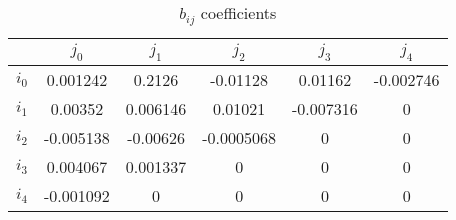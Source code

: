 \begin{table}[h!]
  \centering
  \caption{$b_{ij}$ coefficients}
  \label{tab:noise_b}
  \begin{tabular}{c| c c c c c}
		  & $j_0$ 	  & $j_1$    & $j_2$ 	  & $j_3$	  & $j_4$ \\
	\hline
	$i_0$ & 0.001242  & 0.2126	 & -0.01128	  & 0.01162	  & -0.002746 \\
	$i_1$ & 0.00352   & 0.006146 & 0.01021	  & -0.007316 & 0 \\
	$i_2$ & -0.005138 & -0.00626 & -0.0005068 & 0 		  & 0 \\
	$i_3$ & 0.004067  & 0.001337 & 0 		  & 0 		  & 0 \\
	$i_4$ & -0.001092 & 0 		 & 0 		  & 0 		  & 0 \\
  \end{tabular}
\end{table}



